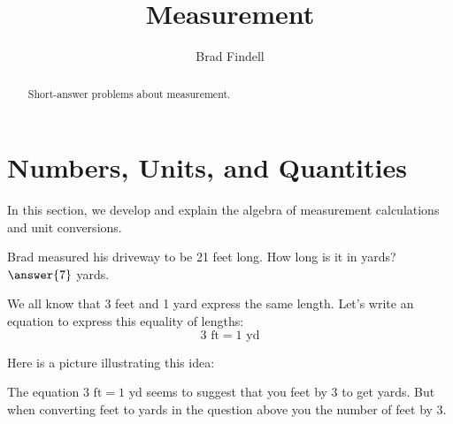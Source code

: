 \documentclass[nooutcomes]{ximera}
\title{Measurement}
\author{Brad Findell}
\begin{document}
\begin{abstract}
Short-answer problems about measurement. 
\end{abstract}
\maketitle




\section{Numbers, Units, and Quantities}
In this section, we develop and explain the algebra of measurement calculations and unit conversions. 

\begin{question}
Brad measured his driveway to be 21 feet long.  How long is it in yards?  
$\answer{7}$ yards.  
\end{question}

We all know that 3 feet and 1 yard express the same length.  Let's write an equation to express this equality of lengths: 
\[
3\textrm{ ft} = 1 \textrm{ yd}
\]

Here is a picture illustrating this idea:  

\begin{image}
\end{image}

The equation $3\textrm{ ft} = 1 \textrm{ yd}$ seems to suggest that you  feet by 3 to get yards.  But when converting feet to yards in the question above you  the number of feet by 3.  
\end{document}
